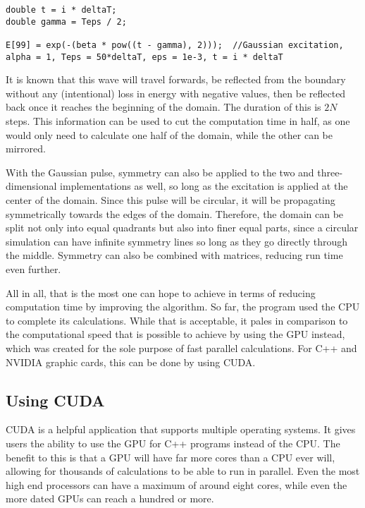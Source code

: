\clearpage

\begin{verbatim}
double t = i * deltaT;
double gamma = Teps / 2;

E[99] = exp(-(beta * pow((t - gamma), 2)));  //Gaussian excitation, alpha = 1, Teps = 50*deltaT, eps = 1e-3, t = i * deltaT
\end{verbatim}

It is known that this wave will travel forwards, be reflected from the boundary without any (intentional) loss in energy with negative values, then be reflected back once it reaches the beginning of the domain. The duration of this is $2N$ steps. This information can be used to cut the computation time in half, as one would only need to calculate one half of the domain, while the other can be mirrored.

With the Gaussian pulse, symmetry can also be applied to the two and three-dimensional implementations as well, so long as the excitation is applied at the center of the domain. Since this pulse will be circular, it will be propagating symmetrically towards the edges of the domain. Therefore, the domain can be split not only into equal quadrants but also into finer equal parts, since a circular simulation can have infinite symmetry lines so long as they go directly through the middle. Symmetry can also be combined with matrices, reducing run time even further.

All in all, that is the most one can hope to achieve in terms of reducing computation time by improving the algorithm. So far, the program used the CPU to complete its calculations. While that is acceptable, it pales in comparison to the computational speed that is possible to achieve by using the GPU instead, which was created for the sole purpose of fast parallel calculations. For C++ and NVIDIA graphic cards, this can be done by using CUDA.
 
\subsection{Using CUDA}\label{sec:cuda}

CUDA is a helpful application that supports multiple operating systems. It gives users the ability to use the GPU for C++ programs instead of the CPU. The benefit to this is that a GPU will have far more cores than a CPU ever will, allowing for thousands of calculations to be able to run in parallel. Even the most high end processors can have a maximum of around eight cores, while even the more dated GPUs can reach a hundred or more. 

